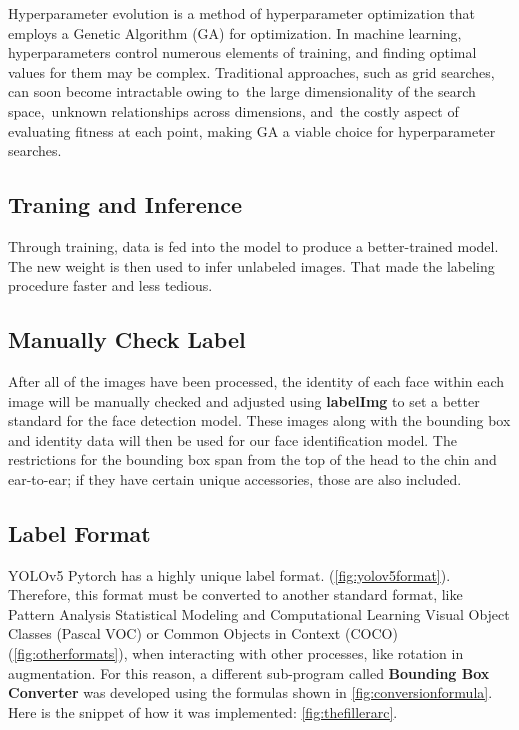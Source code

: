         Hyperparameter evolution is a method of hyperparameter optimization that employs a Genetic Algorithm (GA) for optimization.
        In machine learning, hyperparameters control numerous elements of training, and finding optimal values for them may be complex. 
        Traditional approaches, such as grid searches, can soon become intractable owing to the large dimensionality of the search space, unknown relationships across dimensions, and the costly aspect of evaluating fitness at each point, making GA a viable choice for hyperparameter searches\cite{EvolvingHyperparameter}.
        \subsection{Traning and Inference}
            Through training, data is fed into the model to produce a better-trained model. The new weight is then used to infer unlabeled images. That made the labeling procedure faster and less tedious.
        \subsection{Manually Check Label}
            After all of the images have been processed, the 
            identity of each face within each image will be manually checked and adjusted using \textbf{labelImg}\cite{labelimg} to set a better standard for the 
            face detection model. These images along with the bounding box and identity 
            data will then be used for our face identification model. The restrictions for the bounding box span from the top of the head to the chin and ear-to-ear; if they have certain unique accessories, those are also included.
        \subsection{Label Format}
            YOLOv5 Pytorch has a highly unique label format. (\autoref{fig:yolov5format}). 
            Therefore, this format must be converted to another standard format, like Pattern Analysis Statistical Modeling and Computational Learning Visual Object Classes (Pascal VOC)\cite{pascalvoc} or Common Objects in Context (COCO)\cite{coco} (\autoref{fig:otherformats}), when interacting with other processes, like rotation in augmentation.
            For this reason, a different sub-program called \textbf{Bounding Box Converter}\cite{boundingboxconverter} was developed using the formulas shown in \autoref{fig:conversionformula}. Here is the snippet of how it was implemented: \autoref{fig:thefillerarc}.